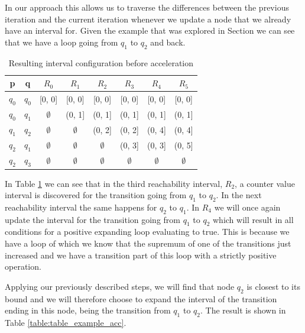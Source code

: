 \documentclass[12pt]{thesis}
\begin{document}
In our approach this allows us to traverse the differences between the previous iteration and the current iteration whenever we update a node that we already have an interval for. Given the example that was explored in Section  we can see that we have a loop going from $q_1$ to $q_2$ and back. 

\begin{table}[h]
	\begin{tabular}{ |c|c|c|c|c|c|c|c| }
		\hline
		p		& q 	& $R_0$ 		& $R_1$			& $R_2$			& $R_3$			& $R_4$ 		& $R_5$ \\
		\hline
		$q_0$	& $q_0$ & [0, 0] 		& [0, 0] 		& [0, 0] 		& [0, 0]		& [0, 0]		& [0, 0] \\
		$q_0$	& $q_1$ & $\emptyset$ 	& (0, 1]		& (0, 1] 		& (0, 1]		& (0, 1] 		& (0, 1] \\
		$q_1$	& $q_2$ & $\emptyset$ 	& $\emptyset$ 	& (0, 2] 		& (0, 2]		& (0, 4] 		& (0, 4] \\
		$q_2$	& $q_1$ & $\emptyset$ 	& $\emptyset$ 	& $\emptyset$	& (0, 3]		& (0, 3] 		& (0, 5] \\
		$q_2$	& $q_3$ & $\emptyset$ 	& $\emptyset$ 	& $\emptyset$	& $\emptyset$	& $\emptyset$	& $\emptyset$ \\
		\hline
	\end{tabular}
	\centering
	\caption{Resulting interval configuration before acceleration}
	\label{table:table_example_no_acc}
\end{table}

In Table \ref{table:table_example_no_acc} we can see that in the third reachability interval, $R_2$, a counter value interval is discovered for the transition going from $q_1$ to $q_2$. In the next reachability interval the same happens for $q_2$ to $q_1$. In $R_4$ we will once again update the interval for the transition going from $q_1$ to $q_2$ which will result in all conditions for a positive expanding loop evaluating to true. This is because we have a loop of which we know that the supremum of one of the transitions just increased and we have a transition part of this loop with a strictly positive operation.

Applying our previously described steps, we will find that node $q_2$ is closest to its bound and we will therefore choose to expand the interval of the transition ending in this node, being the transition from $q_1$ to $q_2$. The result is shown in Table \ref{table:table_example_acc}.
\end{document}
